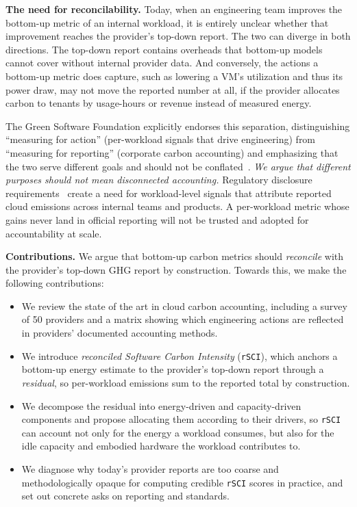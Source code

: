 \documentclass[sigconf,screen,nonacm]{acmart}
\newcommand{\parag}[1]{\vspace{2mm}\noindent\textbf{#1.}\hspace{2mm}}
\newcommand{\RSCI}{\texttt{rSCI}\xspace}
\begin{document}
\parag{The need for reconcilability}
Today, when an engineering team improves the bottom-up metric of an internal workload, it is entirely unclear whether that improvement reaches the provider's top-down report.
The two can diverge in both directions.
The top-down report contains overheads that bottom-up models cannot cover without internal provider data.
And conversely, the actions a bottom-up metric does capture, such as lowering a VM's utilization and thus its power draw, may not move the reported number at all, if the provider allocates carbon to tenants by usage-hours or revenue instead of measured energy.

The Green Software Foundation explicitly endorses this separation, distinguishing ``measuring for action'' (per-workload signals that drive engineering) from ``measuring for reporting'' (corporate carbon accounting) and emphasizing that the two serve different goals and should not be conflated~\cite{gsf-measuring}.
\emph{We argue that different purposes should not mean disconnected accounting.}
Regulatory disclosure requirements~\cite{eu2022csrd} create a need for workload-level signals that attribute reported cloud emissions across internal teams and products.
A per-workload metric whose gains never land in official reporting will not be trusted and adopted for accountability at scale.

\parag{Contributions}
We argue that bottom-up carbon metrics should \emph{reconcile} with the provider's top-down GHG report by construction.
Towards this, we make the following contributions:
\begin{itemize}
\item We review the state of the art in cloud carbon accounting, including a survey of 50 providers and a matrix showing which engineering actions are reflected in providers' documented accounting methods.
\item We introduce \emph{reconciled Software Carbon Intensity} (\RSCI), which anchors a bottom-up energy estimate to the provider's top-down report through a \emph{residual}, so per-workload emissions sum to the reported total by construction.
\item We decompose the residual into energy-driven and capacity-driven components and propose allocating them according to their drivers, so \RSCI can account not only for the energy a workload consumes, but also for the idle capacity and embodied hardware the workload contributes to.
\item We diagnose why today's provider reports are too coarse and methodologically opaque for computing credible \RSCI scores in practice, and set out concrete asks on reporting and standards.
\end{itemize}
\end{document}

